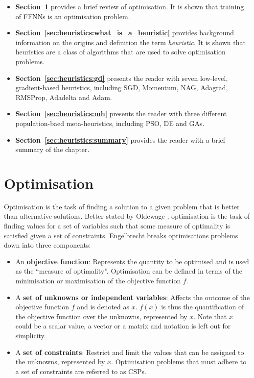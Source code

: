 \begin{itemize}
      \item \textbf{Section~\ref{sec:heuristics:optimisation}} provides a brief review of optimisation. It is shown that training of \acp{FFNN} is an optimisation problem.

      \item \textbf{Section~\ref{sec:heuristics:what_is_a_heuristic}} provides background information on the origins and definition the term \textit{heuristic}. It is shown that heuristics are a class of algorithms that are used to solve optimisation problems.

      \item \textbf{Section~\ref{sec:heuristics:gd}} presents the reader with seven low-level, gradient-based heuristics, including \acf{SGD}, \acf{Momentum}, \acf{NAG}, \acf{Adagrad}, \acf{RMSProp}, \acf{Adadelta} and \acf{Adam}.

      \item \textbf{Section~\ref{sec:heuristics:mh}} presents the reader with three different population-baed meta-heuristics, including \acf{PSO}, \acf{DE} and \acfp{GA}.

      \item \textbf{Section~\ref{sec:heuristics:summary}} provides the reader with a brief summary of the chapter.
\end{itemize}

\section{Optimisation}\label{sec:heuristics:optimisation}

Optimisation is the task of finding a solution to a given problem that is better than alternative solutions. Better stated by Oldewage \cite{ref:oldewage:2017}, optimisation is the task of finding values for a set of variables such that some measure of optimality is satisfied given a set of constraints. Engelbrecht \cite{ref:engelbrecht:2007} breaks optimisations problems down into three components:

\begin{itemize}
      \item An \textbf{objective function}: Represents the quantity to be optimised and is used as the ``measure of optimality''. Optimisation can be defined in terms of the minimisation or maximisation of the objective function $f$.

      \item A \textbf{set of unknowns or independent variables}: Affects the outcome of the objective function $f$ and is denoted as $x$. $f(x)$ is thus the quantification of the objective function over the unknowns, represented by $x$. Note that $x$ could be a scalar value, a vector or a matrix and notation is left out for simplicity.

      \item A \textbf{set of constraints}: Restrict and limit the values that can be assigned to the unknowns, represented by $x$. Optimisation problems that must adhere to a set of constraints are referred to as \acfp{CSP}.
\end{itemize}

